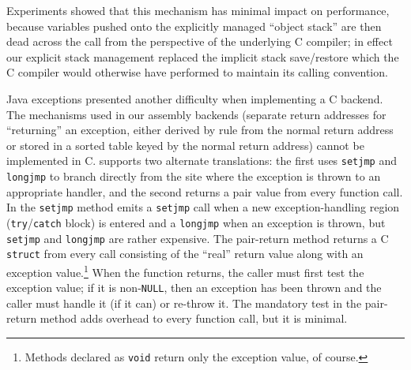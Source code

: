 Experiments showed that this mechanism has minimal impact on
performance, because variables pushed onto the explicitly managed
``object stack'' are then dead across the call from the perspective
of the underlying C compiler; in effect our explicit stack management
replaced the implicit stack save/restore which the C compiler would
otherwise have performed to maintain its calling convention.

Java exceptions presented another difficulty when implementing a C
backend.  The mechanisms used in our assembly backends (separate
return addresses for ``returning'' an exception, either derived by
rule from the normal return address or stored in a sorted table keyed
by the normal return address) cannot be implemented in C\@.  \Flex supports
two alternate translations: the first uses \texttt{setjmp} and
\texttt{longjmp} to branch directly from the site where the exception
is thrown to an appropriate handler, and the second returns a pair
value from every function call.  In the \texttt{setjmp} method \flex emits
a \texttt{setjmp} call when a new exception-handling region
(\texttt{try}/\texttt{catch} block) is entered and a \texttt{longjmp}
when an exception is thrown,
but \texttt{setjmp} and \texttt{longjmp} are rather
expensive.  The pair-return method returns a C \texttt{struct} from every
call consisting of the ``real'' return value along with an exception
value.\footnote{Methods declared as \texttt{void} return only the
  exception value, of course.}  When the function returns, the caller
must first test the exception value; if it is non-\texttt{NULL}, then
an exception has been thrown and the caller must handle it (if it can)
or re-throw it.
The mandatory test in the pair-return method adds overhead to every
function call, but it is minimal.  


